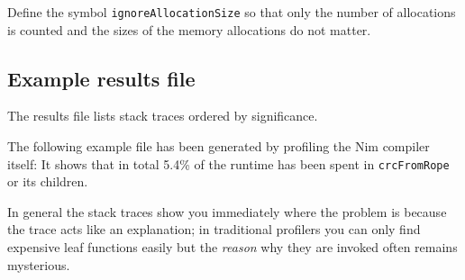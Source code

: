 Define the symbol \texttt{ignoreAllocationSize} so that only the number
of allocations is counted and the sizes of the memory allocations do not
matter.

\hypertarget{example-results-file}{%
\subsection{Example results file}\label{example-results-file}}

The results file lists stack traces ordered by significance.

The following example file has been generated by profiling the Nim
compiler itself: It shows that in total 5.4\% of the runtime has been
spent in \texttt{crcFromRope} or its children.

In general the stack traces show you immediately where the problem is
because the trace acts like an explanation; in traditional profilers you
can only find expensive leaf functions easily but the \emph{reason} why
they are invoked often remains mysterious.

